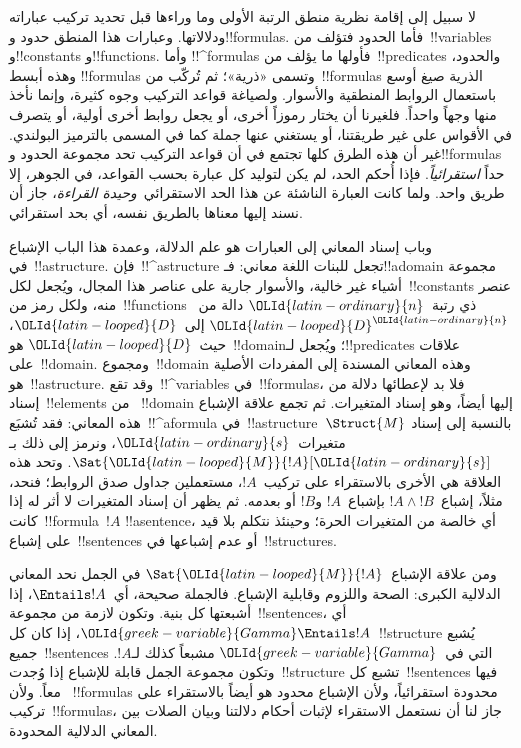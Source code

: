 \documentclass[../../../include/open-logic-section]{subfiles}
\begin{document}


لا سبيل إلى إقامة نظرية منطق الرتبة الأولى وما وراءها قبل تحديد تركيب
عباراته ودلالاتها. وعبارات هذا المنطق حدود و!!{formula}s. فأما الحدود
فتؤلف من~!!{variable}s و!!{constant}s و!!{function}s. وأما
!!^{formula}s فأولها ما يؤلف من~!!{predicate}s والحدود، وهذه أبسط
!!{formula}s وتسمى «ذرية»؛ ثم تُركّب من~!!{formula}s الذرية صيغ أوسع
باستعمال الروابط المنطقية والأسوار. ولصياغة قواعد التركيب وجوه كثيرة،
وإنما نأخذ منها وجهاً واحداً. فلغيرنا أن يختار رموزاً أخرى، أو يجعل
روابط أخرى أولية، أو يتصرف في الأقواس على غير طريقتنا، أو يستغني عنها
جملة كما في المسمى بالترميز البولندي. غير أن هذه الطرق كلها تجتمع في أن
قواعد التركيب تحد مجموعة الحدود و!!{formula}s حداً \emph{استقرائياً}.
فإذا أُحكم الحد، لم يكن لتوليد كل عبارة بحسب القواعد، في الجوهر، إلا طريق
واحد. ولما كانت العبارة الناشئة عن هذا الحد الاستقرائي~\emph{وحيدة
القراءة}، جاز أن نسند إليها معناها بالطريق نفسه، أي بحد استقرائي.

وباب إسناد المعاني إلى العبارات هو علم الدلالة، وعمدة هذا الباب الإشباع
في~!!a{structure}. فإن~!!^a{structure} تجعل للبنات اللغة معاني:
فـ!!a{domain} مجموعة أشياء غير خالية، والأسوار جارية على عناصر هذا
المجال، ويُجعل لكل~!!{constant}s عنصر منه، ولكل رمز من~!!{function}s
ذي رتبة~$\OLId{latin-ordinary}{n}$ دالة من~$\OLId{latin-looped}{D}^\OLId{latin-ordinary}{n}$ إلى~$\OLId{latin-looped}{D}$، حيث~$\OLId{latin-looped}{D}$ هو~!!{domain}؛ ويُجعل
لـ!!{predicate}s علاقات على~!!{domain}. ومجموع~!!{domain} وهذه المعاني
المسندة إلى المفردات الأصلية هو~!!a{structure}. وقد تقع~!!^{variable}s
في~!!{formula}s، فلا بد لإعطائها دلالة من إسناد~!!{element}s من
~!!{domain} إليها أيضاً، وهو إسناد المتغيرات. ثم تجمع علاقة الإشباع هذه
المعاني: فقد تُشبَع~!!^a{formula} في~!!a{structure}~$\Struct{M}$ بالنسبة
إلى إسناد متغيرات~$\OLId{latin-ordinary}{s}$، ونرمز إلى ذلك بـ$\Sat{\OLId{latin-looped}{M}}{!A}[\OLId{latin-ordinary}{s}]$. وتحد هذه
العلاقة هي الأخرى بالاستقراء على تركيب~$!A$، مستعملين جداول صدق الروابط؛
فنحد، مثلاً، إشباع~$!A \land !B$ بإشباع~$!A$ و$!B$ أو بعدمه. ثم يظهر أن
إسناد المتغيرات لا أثر له إذا كانت~!!{formula}~$!A$ !!a{sentence}، أي
خالصة من المتغيرات الحرة؛ وحينئذ نتكلم بلا قيد على إشباع~!!{sentence}s
أو عدم إشباعها في~!!{structure}s.

ومن علاقة الإشباع~$\Sat{\OLId{latin-looped}{M}}{!A}$ في الجمل نحد المعاني الدلالية الكبرى:
الصحة واللزوم وقابلية الإشباع. فالجملة صحيحة، أي~$\Entails !A$، إذا
أشبعتها كل بنية. وتكون لازمة من مجموعة~!!{sentence}s، أي
$\OLId{greek-variable}{Gamma} \Entails !A$، إذا كان كل~!!{structure} يُشبع جميع~!!{sentence}s
التي في~$\OLId{greek-variable}{Gamma}$ مشبعاً كذلك لـ$!A$. وتكون مجموعة الجمل قابلة للإشباع
إذا وُجدت~!!{structure} تشبع كل~!!{sentence}s فيها معاً. ولأن
~!!{formula}s محدودة استقرائياً، ولأن الإشباع محدود هو أيضاً بالاستقراء
على تركيب~!!{formula}s، جاز لنا أن نستعمل الاستقراء لإثبات أحكام دلالتنا
وبيان الصلات بين المعاني الدلالية المحدودة.
\end{document}
